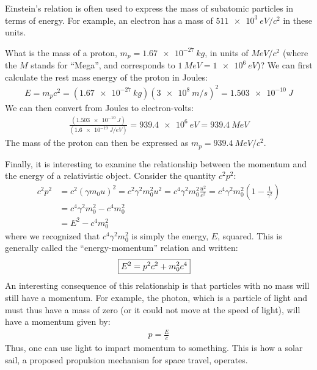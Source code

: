 Einstein's relation is often used to express the mass of subatomic particles in terms of energy. For example, an electron has a mass of $\SI{511e3}{eV/c^2}$ in these units. 

\begin{example}{What is the mass of a proton, $m_p=\SI{1.67e-27}{kg}$, in units of $\si{MeV/c^2}$ (where the $M$ stands for ``Mega'', and corresponds to $\SI{1}{MeV}=\SI{1e6}{eV}$)?}
We can first calculate the rest mass energy of the proton in Joules:
\begin{align*}
E=m_pc^2=(\SI{1.67e-27}{kg})(\SI{3e8}{m/s})^2=\SI{1.503e-10}{J}
\end{align*}
We can then convert from Joules to electron-volts:
\begin{align*}
\frac{(\SI{1.503e-10}{J})}{(\SI{1.6e-19}{J/eV})}=\SI{939.4e6}{eV}=\SI{939.4}{MeV}
\end{align*}
The mass of the proton can then be expressed as $m_p=\SI{939.4}{MeV/c^2}$.
\end{example}

Finally, it is interesting to examine the relationship between the momentum and the energy of a relativistic object. Consider the quantity $c^2p^2$:
\begin{align*}
c^2p^2 &= c^2(\gamma m_0 u)^2=c^2\gamma^2m_0^2u^2=c^4\gamma^2m_0^2\frac{u^2}{c^2}=c^4\gamma^2m_0^2\left(1- \frac{1}{\gamma^2}\right)\\
&=c^4\gamma^2m_0^2 - c^4m_0^2\\
&=E^2-c^4m_0^2
\end{align*}
where we recognized that $c^4\gamma^2m_0^2$ is simply the energy, $E$, squared. This is generally called the ``energy-momentum'' relation and written:
\begin{align*}
\Aboxed{E^2=p^2c^2+m_0^2c^4}
\end{align*}
An interesting consequence of this relationship is that particles with no mass will still have a momentum. For example, the photon, which is a particle of light and must thus have a mass of zero (or it could not move at the speed of light), will have a momentum given by:
\begin{align*}
p=\frac{E}{c}
\end{align*}
Thus, one can use light to impart momentum to something. This is how a solar sail, a proposed propulsion mechanism for space travel, operates.





